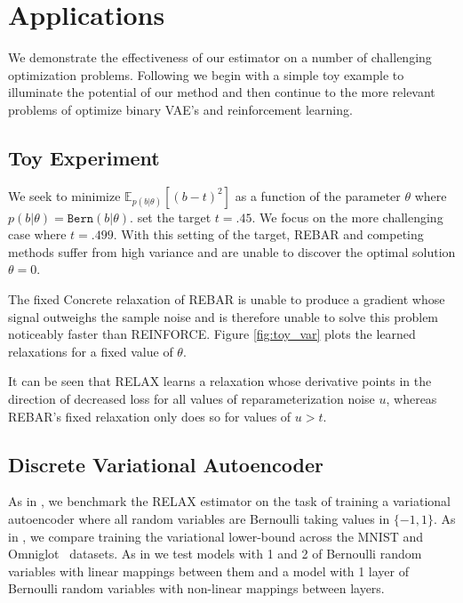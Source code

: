 \documentclass{article}
\newcommand{\relaxed}{r}
\begin{document}






\section{Applications}
\label{Applications}
We demonstrate the effectiveness of our estimator on a number of challenging optimization problems. Following \cite{tucker2017rebar} we begin with a simple toy example to illuminate the potential of our method and then continue to the more relevant problems of optimize binary VAE's and reinforcement learning.

\subsection{Toy Experiment}
We seek to minimize $\mathbb{E}_{p(b|\theta)}[(b - t)^2]$ as a function of the parameter $\theta$ where $p(b|\theta) = \mathtt{Bern}(b|\theta)$. \cite{tucker2017rebar} set the target $t = .45$.
We focus on the more challenging case where $t = .499$.
With this setting of the target, REBAR and competing methods suffer from high variance and are unable to discover the optimal solution $\theta = 0$.

The fixed Concrete relaxation of REBAR is unable to produce a gradient whose signal outweighs the sample noise and is therefore unable to solve this problem noticeably faster than REINFORCE.
Figure \ref{fig:toy_var} plots the learned relaxations for a fixed value of $\theta$.

It can be seen that RELAX learns a relaxation whose derivative points in the direction of decreased loss for all values of reparameterization noise $u$, whereas REBAR's fixed relaxation only does so for values of $u > t$.


\subsection{Discrete Variational Autoencoder}
As in \citep{tucker2017rebar}, we benchmark the RELAX estimator on the task of training a variational autoencoder \citep{kingma2013autoencoding, rezende2014stochastic} where all random variables are Bernoulli taking values in $\{-1, 1\}$.
As in \cite{tucker2017rebar}, we compare training the variational lower-bound across the MNIST and Omniglot~\citep{lake2015human} datasets.
As in \cite{tucker2017rebar} we test models with 1 and 2 of Bernoulli random variables with linear mappings between them and a model with 1 layer of Bernoulli random variables with non-linear mappings between layers.
\end{document}
